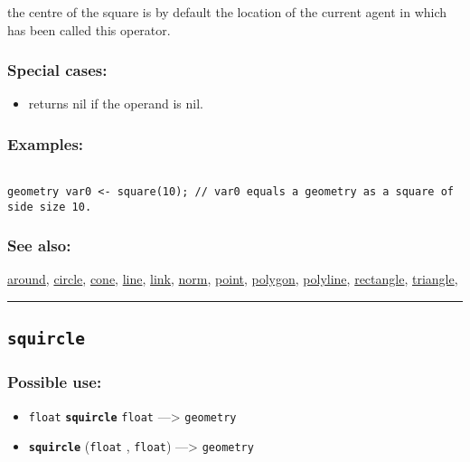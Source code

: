 \documentclass[]{book}
\providecommand{\tightlist}{%
  \setlength{\itemsep}{0pt}\setlength{\parskip}{0pt}}
\theoremstyle{definition}
\theoremstyle{definition}
\theoremstyle{definition}
\theoremstyle{remark}
\begin{document}
the centre of the square is by default the location of the current agent
in which has been called this operator.

\subsubsection{Special cases:}\label{special-cases-130}

\begin{itemize}
\tightlist
\item
  returns nil if the operand is nil.
\end{itemize}

\subsubsection{Examples:}\label{examples-348}

\begin{verbatim}
 
geometry var0 <- square(10); // var0 equals a geometry as a square of side size 10.
\end{verbatim}

\subsubsection{See also:}\label{see-also-195}

\href{OperatorsAA\#around}{around}, \href{OperatorsBC\#circle}{circle},
\href{OperatorsBC\#cone}{cone}, \href{OperatorsIM\#line}{line},
\href{OperatorsIM\#link}{link}, \href{OperatorsNR\#norm}{norm},
\href{OperatorsNR\#point}{point}, \href{OperatorsNR\#polygon}{polygon},
\href{OperatorsNR\#polyline}{polyline},
\href{OperatorsNR\#rectangle}{rectangle},
\href{OperatorsSZ\#triangle}{triangle},

\begin{center}\rule{0.5\linewidth}{\linethickness}\end{center}

\subsection{\texorpdfstring{\texttt{squircle}}{squircle}}\label{squircle}

\subsubsection{Possible use:}\label{possible-use-500}

\begin{itemize}
\tightlist
\item
  \texttt{float} \textbf{\texttt{squircle}} \texttt{float}
  ---\textgreater{} \texttt{geometry}
\item
  \textbf{\texttt{squircle}} (\texttt{float} , \texttt{float})
  ---\textgreater{} \texttt{geometry}
\end{itemize}
\end{document}
